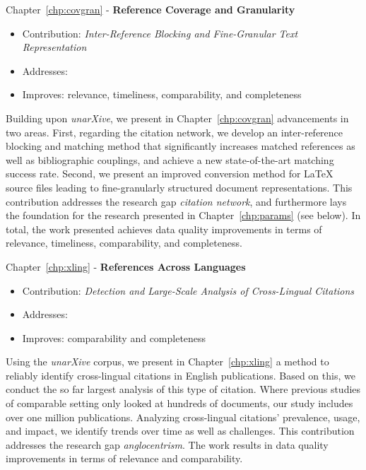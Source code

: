 Chapter~\ref{chp:covgran} - \textbf{Reference Coverage and Granularity}
\begin{itemize}
    \setlength\itemsep{-0.5em}
    \item Contribution: \textit{Inter-Reference Blocking and Fine-Granular Text Representation}
    \item Addresses: 
    \item Improves: relevance, timeliness, comparability, and completeness
\end{itemize}
Building upon \emph{unarXive}, we present in Chapter~\ref{chp:covgran} advancements in two areas. First, regarding the citation network, we develop an inter-reference blocking and matching method that significantly increases matched references as well as bibliographic couplings, and achieve a new state-of-the-art matching success rate. Second, we present an improved conversion method for \LaTeX{} source files leading to fine-granularly structured document representations. %
This contribution addresses the research gap \emph{citation network}, and furthermore lays the foundation for the research presented in Chapter~\ref{chp:params} (see below).
In total, the work presented achieves data quality improvements in terms of relevance, timeliness, comparability, and completeness.

Chapter~\ref{chp:xling} - \textbf{References Across Languages}
\begin{itemize}
    \setlength\itemsep{-0.5em}
    \item Contribution: \textit{Detection and Large-Scale Analysis of Cross-Lingual Citations}
    \item Addresses: 
    \item Improves: comparability and completeness
\end{itemize}
Using the \emph{unarXive} corpus, we present in Chapter~\ref{chp:xling} a method to reliably identify cross-lingual citations in English publications. Based on this, we conduct the so far largest analysis of this type of citation. Where previous studies of comparable setting only looked at hundreds of documents, our study includes over one million publications. Analyzing cross-lingual citations' prevalence, usage, and impact, we identify trends over time as well as challenges.
This contribution addresses the research gap \emph{anglocentrism}.
The work results in data quality improvements in %
terms of 
relevance and comparability.

